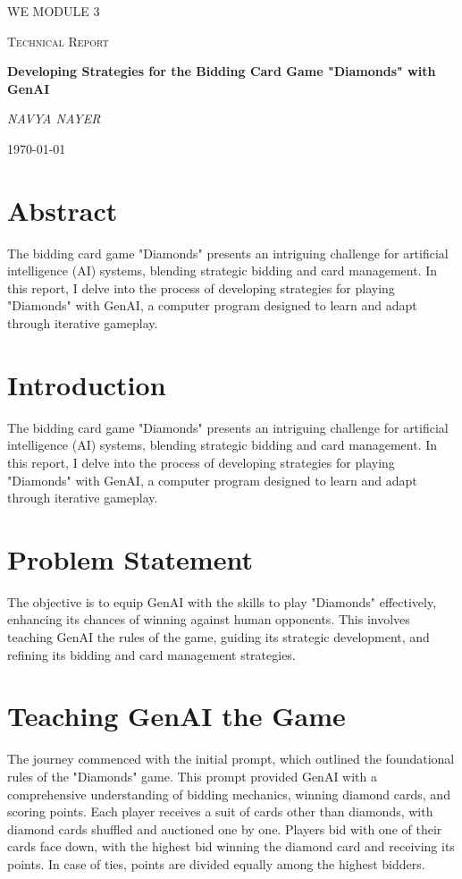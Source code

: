 \documentclass{article}
\begin{document}
\begin{titlepage}
    \centering
    \vspace*{2cm}
    {\scshape\LARGE WE MODULE 3 \par}
    \vspace{1cm}
    {\scshape\Large Technical Report\par}
    \vspace{1.5cm}
    {\huge\bfseries Developing Strategies for the Bidding Card Game "Diamonds" with GenAI\par}
    \vspace{0.5cm}
    {\Large\itshape NAVYA NAYER\par}
    \vfill
    {\large \today\par}
\end{titlepage}

\section{Abstract}
The bidding card game "Diamonds" presents an intriguing challenge for artificial intelligence (AI) systems, blending strategic bidding and card management. In this report, I delve into the process of developing strategies for playing "Diamonds" with GenAI, a computer program designed to learn and adapt through iterative gameplay.

\section{Introduction}
The bidding card game "Diamonds" presents an intriguing challenge for artificial intelligence (AI) systems, blending strategic bidding and card management. In this report, I delve into the process of developing strategies for playing "Diamonds" with GenAI, a computer program designed to learn and adapt through iterative gameplay.

\section{Problem Statement}
The objective is to equip GenAI with the skills to play "Diamonds" effectively, enhancing its chances of winning against human opponents. This involves teaching GenAI the rules of the game, guiding its strategic development, and refining its bidding and card management strategies.

\section{Teaching GenAI the Game}
The journey commenced with the initial prompt, which outlined the foundational rules of the "Diamonds" game. This prompt provided GenAI with a comprehensive understanding of bidding mechanics, winning diamond cards, and scoring points. Each player receives a suit of cards other than diamonds, with diamond cards shuffled and auctioned one by one. Players bid with one of their cards face down, with the highest bid winning the diamond card and receiving its points. In case of ties, points are divided equally among the highest bidders.
\end{document}
